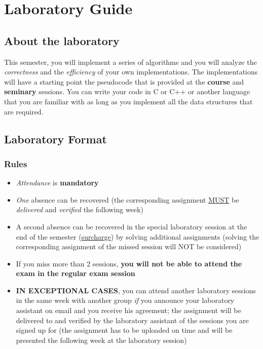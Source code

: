 \documentclass[../en-fa-lab.tex]{subfiles}
\begin{document}
\section{\texorpdfstring{\textbf{Laboratory Guide}}{Laboratory Guide}}\label{laboratory-guide}
\subsection{\texorpdfstring{\textbf{About the
laboratory}}{About the laboratory}}\label{about-the-laboratory}

This semester, you will implement a series of algorithms and you will
analyze the \emph{correctness} and the \emph{efficiency} of your own
implementations. The implementations will have a starting point the
pseudocode that is provided at the \textbf{course} and \textbf{seminary}
sessions. You can write your code in C or C++ or another language that
you are familiar with as long as you implement all the data structures
that are required.

\subsection{\texorpdfstring{\textbf{Laboratory
Format}}{Laboratory Format}}\label{laboratory-format}

\subsubsection{\texorpdfstring{\textbf{Rules}}{Rules}}\label{rules}

\begin{itemize}
\item
  \emph{Attendance} is \textbf{mandatory}
\item
  \emph{One} absence can be recovered (the corresponding assignment
  \ul{MUST} be \emph{delivered} and \emph{verified} the following week)
\item
  A second absence can be recovered in the special laboratory session at
  the end of the semester (\ul{surcharge}) by solving additional
  assignments (solving the corresponding assignment of the missed
  session will NOT be considered)
\item
  If you miss more than 2 sessions, \textbf{you will not be able to
  attend the exam in the regular exam session}
\item
  \textbf{IN EXCEPTIONAL CASES}, you can attend another laboratory
  sessions in the same week with another group \emph{if} you announce
  your laboratory assistant on email and you receive his agreement; the
  assignment will be delivered to and verified by the laboratory
  assistant of the sessions you are signed up for (the assignment has to
  be uploaded on time and will be presented the following week at the
  laboratory session)
\end{itemize}
\end{document}
